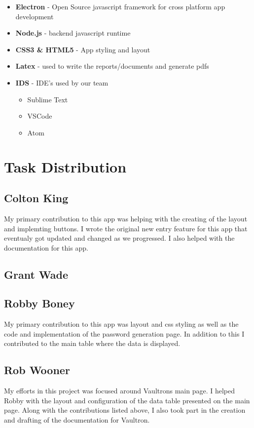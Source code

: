 \documentclass[11pt]{report}
\begin{document}
\begin{itemize}
    \item \textbf{Electron} - Open Source javascript framework for cross platform app development
    \item \textbf{Node.js} - backend javascript runtime
    \item \textbf{CSS3 \& HTML5} - App styling and layout
    \item \textbf{Latex} - used to write the reports/documents and generate pdfs
    \item \textbf{IDS} - IDE's used by our team 
        \begin{itemize}
            \item Sublime Text
            \item VSCode
            \item Atom
        \end{itemize}
\end{itemize}


\section{Task Distribution}

\subsection{Colton King}
My primary contribution to this app was helping with the creating of the layout
and implemting buttons. I wrote the original new entry feature for this app 
that eventualy got updated and changed as we progressed. I also helped with 
the documentation for this app.
\subsection{Grant Wade}

\subsection{Robby Boney}
My primary contribution to this app was layout and css styling as well as the 
code and implementation of the password generation page. In addition to this
I contributed to the main table where the data is displayed.

\subsection{Rob Wooner}
My efforts in this project was focused around Vaultrons main page. I helped
Robby with the layout and configuration of the data table presented on the main
page. Along with the contributions listed above, I also took part in the creation 
and drafting of the documentation for Vaultron.
\end{document}
